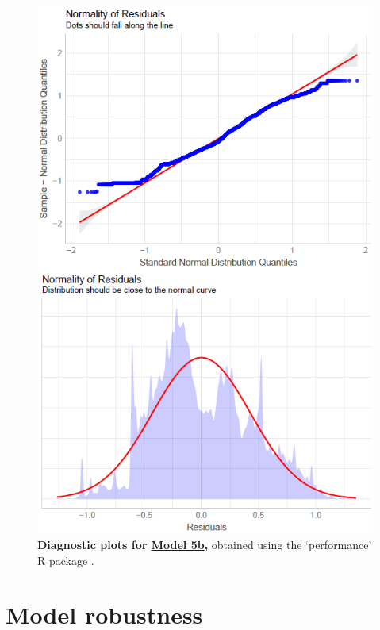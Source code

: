 \begin{figure}[h!]
\centering
\includegraphics[scale=0.8]{Supporting/Chapter3/Figures/Diagnostics/Model5b_diag.png}
\caption[Diagnostic plots for Model 5b]{\textbf{Diagnostic plots for \underline{Model 5b},} obtained using the `performance' R package \citep{performance}.}
\label{SI3_F17}
\end{figure}

\newpage
\clearpage

\section{Model robustness}


